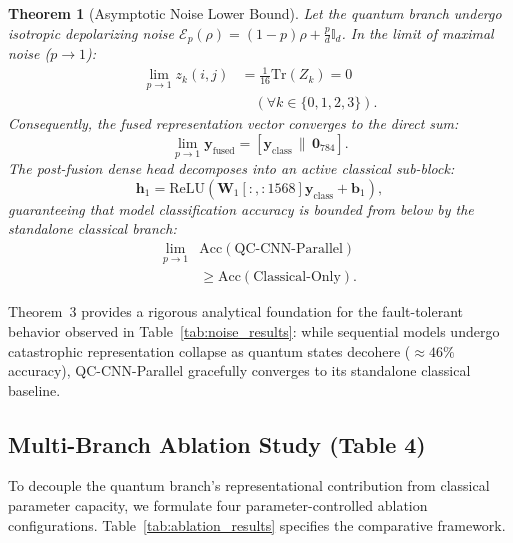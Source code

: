 \documentclass[journal]{IEEEtran}
\newtheorem{theorem}{Theorem}
\begin{document}
\begin{theorem}[Asymptotic Noise Lower Bound]
Let the quantum branch undergo isotropic depolarizing noise $\mathcal{E}_p(\rho) = (1-p)\rho + \frac{p}{d}\mathbb{I}_d$. In the limit of maximal noise ($p \to 1$):
\begin{align}
\lim_{p \to 1} z_k(i, j) &= \frac{1}{16} \mathrm{Tr}(Z_k) = 0 \nonumber \\
&\quad (\forall k \in \{0, 1, 2, 3\}).
\end{align}
Consequently, the fused representation vector converges to the direct sum:
\begin{equation}
\lim_{p \to 1} \mathbf{y}_{\mathrm{fused}} = [\mathbf{y}_{\mathrm{class}} \,\|\, \mathbf{0}_{784}].
\label{eq:asymptotic_collapse}
\end{equation}
The post-fusion dense head decomposes into an active classical sub-block:
\begin{equation}
\mathbf{h}_1 = \mathrm{ReLU}\left( \mathbf{W}_1[:, :1568] \mathbf{y}_{\mathrm{class}} + \mathbf{b}_1 \right),
\end{equation}
guaranteeing that model classification accuracy is bounded from below by the standalone classical branch:
\begin{align}
\lim_{p \to 1} &\mathrm{Acc}(\text{QC-CNN-Parallel}) \nonumber \\
&\ge \mathrm{Acc}(\text{Classical-Only}).
\label{eq:accuracy_lower_bound}
\end{align}
\end{theorem}

Theorem~3 provides a rigorous analytical foundation for the fault-tolerant behavior observed in Table~\ref{tab:noise_results}: while sequential models undergo catastrophic representation collapse as quantum states decohere ($\approx 46\%$ accuracy), QC-CNN-Parallel gracefully converges to its standalone classical baseline.

\subsection{Multi-Branch Ablation Study (Table 4)}
To decouple the quantum branch's representational contribution from classical parameter capacity, we formulate four parameter-controlled ablation configurations. Table~\ref{tab:ablation_results} specifies the comparative framework.
\end{document}
